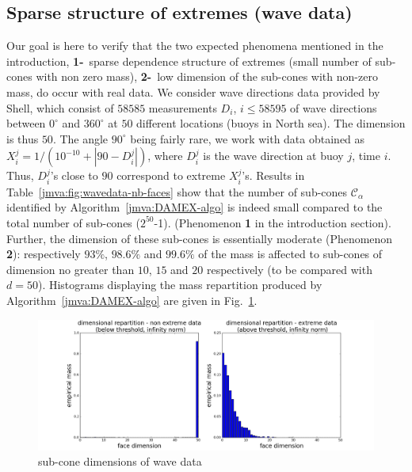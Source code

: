 \subsection{Sparse structure of extremes  (wave data)}
Our goal is here to verify that the two expected phenomena mentioned
in the introduction, \textbf{1-}~sparse dependence structure of extremes (small number
of sub-cones with non zero mass), \textbf{2-}~low dimension of the
sub-cones with non-zero mass,  do occur with real data. 
We consider wave
directions data provided by Shell, which consist of $58585$
measurements  $D_i$, $i\le 58595$ of wave directions between $0^{\circ}$ and $360^{\circ}$ at $50$ different
locations (buoys in North sea). The dimension is thus $50$. %
The angle $90^{\circ}$ being fairly
rare, we work with data obtained as $X_i^j = 1/(10^{-10} + |90-
D_i^j|)$, where $D_i^j$ is the wave direction at buoy $j$, time $i$. Thus,
$D_i^j$'s close to $90$ correspond to  extreme $X_i^j$'s.
Results in
Table~\ref{jmva:fig:wavedata-nb-faces}%
show that 
the %
number of  sub-cones $\mathcal{C}_\alpha$ identified by Algorithm~\ref{jmva:DAMEX-algo}
is indeed small compared to the total number of sub-cones ($2^{50}$-1).
(Phenomenon \textbf{1} in the introduction section). 
Further, the dimension of these sub-cones is essentially moderate
(Phenomenon \textbf{2}):
respectively $93\%$, $98.6\%$ and  $99.6\%$
of the mass is affected to  sub-cones of dimension no greater  than $10$,
$15$ and $20$ respectively %
(to be compared with $d=50$).  Histograms displaying the mass repartition produced by Algorithm~\ref{jmva:DAMEX-algo} are given in Fig.~\ref{jmva:fig:wavedata-dim}.
\begin{figure}[!ht]
\centering
\includegraphics[scale=0.33]{fig_source/wave_dir2}
\caption{sub-cone dimensions of wave data}
\label{jmva:fig:wavedata-dim}
\end{figure}

